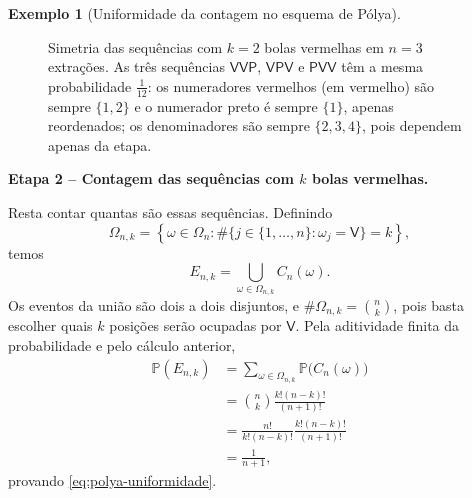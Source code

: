 \documentclass[12pt,portuguese]{article}
\theoremstyle{definition}
\newtheorem{example}[example]{Exemplo}
\begin{document}
\begin{example}[Uniformidade da contagem no esquema de Pólya]
\begin{figure}[H]
\caption{Simetria das sequências com $k=2$ bolas vermelhas em $n=3$ extrações.
As três sequências $\mathsf{VVP}$, $\mathsf{VPV}$ e $\mathsf{PVV}$ têm a mesma
probabilidade $\frac{1}{12}$: os numeradores vermelhos (em vermelho) são sempre
$\{1,2\}$ e o numerador preto é sempre $\{1\}$, apenas reordenados; os
denominadores são sempre $\{2,3,4\}$, pois dependem apenas da etapa.}
\label{fig:polya-simetria}
\end{figure}

\smallskip
\noindent\textbf{Etapa 2 -- Contagem das sequências com $k$ bolas vermelhas.}

Resta contar quantas são essas sequências. Definindo
\[
  \Omega_{n,k}
  =\left\{\omega\in\Omega_n:
    \#\{j\in\{1,\ldots,n\}:\omega_j=\mathsf{V}\}=k\right\},
\]
temos
\[
  E_{n,k}=\bigcup_{\omega\in\Omega_{n,k}} C_n(\omega).
\]
Os eventos da união são dois a dois disjuntos, e $\#\Omega_{n,k}=\binom{n}{k}$, pois basta escolher quais $k$ posições serão ocupadas por $\mathsf{V}$. Pela aditividade finita da probabilidade e pelo cálculo anterior,
\[
  \begin{aligned}
    \mathbb{P}(E_{n,k})
    &= \sum_{\omega\in\Omega_{n,k}}\mathbb{P}\big(C_n(\omega)\big) \\
    &= \binom{n}{k}\frac{k!(n-k)!}{(n+1)!} \\
    &= \frac{n!}{k!(n-k)!}\frac{k!(n-k)!}{(n+1)!} \\
    &= \frac{1}{n+1},
  \end{aligned}
\]
provando \eqref{eq:polya-uniformidade}.


\end{example}
\end{document}

